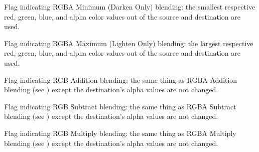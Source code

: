 \documentclass[letterpaper,10pt,english]{sphinxmanual}
\begin{document}

\begin{fulllineitems}
\label{sge:sge.sge.BLEND_RGBA_MINIMUM}
Flag indicating RGBA Minimum (Darken Only) blending: the smallest
respective red, green, blue, and alpha color values out of the source
and destination are used.

\end{fulllineitems}


\begin{fulllineitems}
\label{sge:sge.sge.BLEND_RGBA_MAXIMUM}
Flag indicating RGBA Maximum (Lighten Only) blending: the largest
respective red, green, blue, and alpha color values out of the source
and destination are used.

\end{fulllineitems}


\begin{fulllineitems}
\label{sge:sge.sge.BLEND_RGB_ADD}
Flag indicating RGB Addition blending: the same thing as RGBA
Addition blending (see {\hyperref[sge:sge.sge.BLEND_RGBA_ADD]{\emph{}}}) except the
destination's alpha values are not changed.

\end{fulllineitems}


\begin{fulllineitems}
\label{sge:sge.sge.BLEND_RGB_SUBTRACT}
Flag indicating RGB Subtract blending: the same thing as RGBA
Subtract blending (see {\hyperref[sge:sge.sge.BLEND_RGBA_SUBTRACT]{\emph{}}}) except the
destination's alpha values are not changed.

\end{fulllineitems}


\begin{fulllineitems}
\label{sge:sge.sge.BLEND_RGB_MULTIPLY}
Flag indicating RGB Multiply blending: the same thing as RGBA
Multiply blending (see {\hyperref[sge:sge.sge.BLEND_RGBA_MULTIPLY]{\emph{}}}) except the
destination's alpha values are not changed.

\end{fulllineitems}
\end{document}
